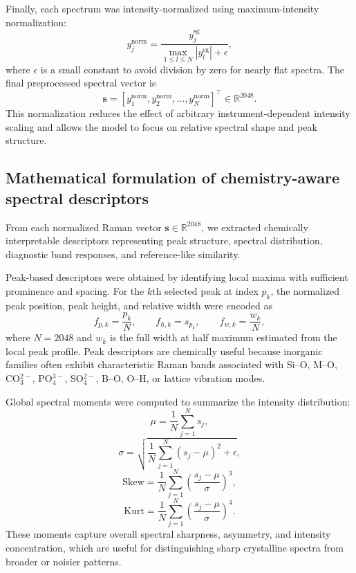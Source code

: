 Finally, each spectrum was intensity-normalized using maximum-intensity normalization:
\begin{equation}
y_j^{\mathrm{norm}}=
\frac{y_j^{\mathrm{sg}}}
{\max_{1\leq l\leq N}|y_l^{\mathrm{sg}}|+\epsilon},
\end{equation}
where $\epsilon$ is a small constant to avoid division by zero for nearly flat spectra. The final preprocessed spectral vector is
\begin{equation}
\mathbf{s}=
[y_1^{\mathrm{norm}},y_2^{\mathrm{norm}},\ldots,y_N^{\mathrm{norm}}]^\top
\in \mathbb{R}^{2048}.
\end{equation}
This normalization reduces the effect of arbitrary instrument-dependent intensity scaling and allows the model to focus on relative spectral shape and peak structure.

\subsection{Mathematical formulation of chemistry-aware spectral descriptors}
\label{subsec:feature_formulas}

From each normalized Raman vector $\mathbf{s}\in\mathbb{R}^{2048}$, we extracted chemically interpretable descriptors representing peak structure, spectral distribution, diagnostic band responses, and reference-like similarity.

Peak-based descriptors were obtained by identifying local maxima with sufficient prominence and spacing. For the $k$th selected peak at index $p_k$, the normalized peak position, peak height, and relative width were encoded as
\begin{equation}
f_{p,k}=\frac{p_k}{N}, \qquad
f_{h,k}=s_{p_k}, \qquad
f_{w,k}=\frac{w_k}{N},
\end{equation}
where $N=2048$ and $w_k$ is the full width at half maximum estimated from the local peak profile. Peak descriptors are chemically useful because inorganic families often exhibit characteristic Raman bands associated with Si--O, M--O, CO$_3^{2-}$, PO$_4^{3-}$, SO$_4^{2-}$, B--O, O--H, or lattice vibration modes.

Global spectral moments were computed to summarize the intensity distribution:
\begin{equation}
\mu=\frac{1}{N}\sum_{j=1}^{N}s_j,
\end{equation}
\begin{equation}
\sigma=\sqrt{\frac{1}{N}\sum_{j=1}^{N}(s_j-\mu)^2+\epsilon},
\end{equation}
\begin{equation}
\mathrm{Skew}=\frac{1}{N}\sum_{j=1}^{N}\left(\frac{s_j-\mu}{\sigma}\right)^3,
\end{equation}
\begin{equation}
\mathrm{Kurt}=\frac{1}{N}\sum_{j=1}^{N}\left(\frac{s_j-\mu}{\sigma}\right)^4.
\end{equation}
These moments capture overall spectral sharpness, asymmetry, and intensity concentration, which are useful for distinguishing sharp crystalline spectra from broader or noisier patterns.

